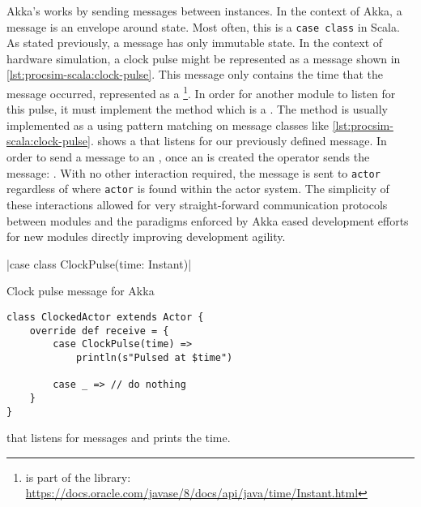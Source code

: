 Akka's \akkaActor{} works by sending messages between \akkaActor{} instances. In the context of Akka, a message is an envelope around state. Most often, this is a \texttt{case class} in Scala. As stated previously, a message has only immutable state. In the context of hardware simulation, a clock pulse might be represented as a message shown in \cref{lst:procsim-scala:clock-pulse}. This message only contains the time that the message occurred, represented as a \footnote{ is part of the  library: \url{https://docs.oracle.com/javase/8/docs/api/java/time/Instant.html}{}}. In order for another module to listen for this pulse, it must implement the  method which is a . The  method is usually implemented as a  using pattern matching \cite{Scala-PatternMatching} on message classes like \cref{lst:procsim-scala:clock-pulse}.  shows a \akkaActor{} that listens for our previously defined  message. In order to send a message to an \akkaActor{}, once an \akkaActor{} is created the \scalainline{!} operator sends the message: . With no other interaction required, the message is sent to \texttt{actor} regardless of where \texttt{actor} is found within the actor system. The simplicity of these interactions allowed for very straight-forward communication protocols between modules and the paradigms enforced by Akka eased development efforts for new modules directly improving development agility.

\begin{listing}[b!]
    |case class ClockPulse(time: Instant)|
    \caption{Clock pulse message for Akka}
    \label{lst:procsim-scala:clock-pulse}
\end{listing}

\begin{listing}[t!]
\begin{verbatim}
class ClockedActor extends Actor {
    override def receive = {
        case ClockPulse(time) => 
            println(s"Pulsed at $time")
        
        case _ => // do nothing
    }
}
\end{verbatim}
\caption{\akkaActor{} that listens for  messages and prints the time.}
\label{lst:procsim-scala:clock-pulse-actor}
\end{listing}


